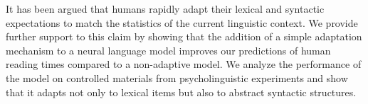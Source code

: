 It has been argued that humans rapidly adapt their lexical and syntactic expectations to match the statistics of the current linguistic context. We provide further support to this claim by showing that the addition of a simple adaptation mechanism to a neural language model improves our predictions of human reading times compared to a non-adaptive model. We analyze the performance of the model on controlled materials from psycholinguistic experiments and show that it adapts not only to lexical items but also to abstract syntactic structures.
